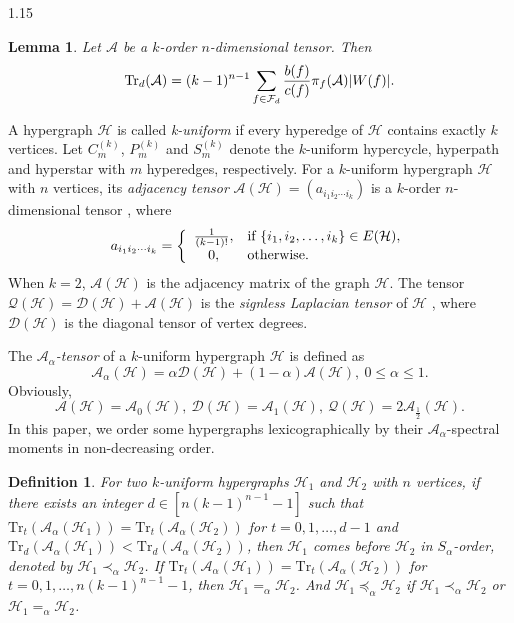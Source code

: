 \documentclass[preprint,12pt]{elsarticle1}
\newtheorem{lem}[thm]{Lemma}
\newtheorem{defi}[thm]{Definition}
\numberwithin{equation}{section}
\begin{document}
\begin{spacing}{1.15}
\begin{lem}\label{Shao}\cite{ref8}
		Let $\mathcal{A}$ be a $k$-order $n$-dimensional tensor. Then
		\begin{equation*}\label{shaodegongshi}
			\textnormal{Tr}_{d}(\mathcal{A})=(k-1)^{n-1} \sum_{f \in \mathcal{F}_{d}} \frac{b(f)}{c(f)} \pi_{f}(\mathcal{A})|W(f)|.
		\end{equation*}
	\end{lem}	

A hypergraph $\mathcal{H}$ is called \textit{k-uniform} if every hyperedge of $\mathcal{H}$ contains exactly $k$ vertices.
Let $C_{m}^{(k)}$, $P_{m}^{(k)}$ and $S_{m}^{(k)}$ denote the $k$-uniform hypercycle, hyperpath and hyperstar with $m$ hyperedges, respectively.
For a $k$-uniform hypergraph $\mathcal{H}$ with $n$ vertices, its \textit{adjacency tensor} $\mathcal{A}(\mathcal{H})=(a_{i_1 i_2 \cdots i_k})$ is a $k$-order $n$-dimensional tensor \cite{ref3}, where
		$$a_{i_1 i_2 \cdots i_k}=\left\{\begin{array}{cl}
			\frac{1}{(k-1)!},&  \textnormal{if}\ \{i_1,i_2,\ldots,i_k\}\in E(\mathcal{H}),\\
			0,& \textnormal{otherwise}.
		\end{array}\right.$$
When $k=2$, $\mathcal{A}(\mathcal{H})$ is the adjacency matrix of the graph $\mathcal{H}$.
The tensor $\mathcal{Q}(\mathcal{H})=\mathcal{D}(\mathcal{H})+\mathcal{A}(\mathcal{H})$ is the \textit{signless Laplacian tensor} of $\mathcal{H}$ \cite{ref5}, where $\mathcal{D}(\mathcal{H})$ is the diagonal tensor of vertex degrees.

The \textit{$\mathcal{A}_{\alpha}$-tensor} of a $k$-uniform hypergraph $\mathcal{H}$ is defined as \cite{alphaofhypergraph}
$$\mathcal{A}_{\alpha}(\mathcal{H})=\alpha\mathcal{D}(\mathcal{H})+(1-\alpha)\mathcal{A}(\mathcal{H}),~ 0\le\alpha\le1.$$
Obviously, $$\mathcal{A}(\mathcal{H})=\mathcal{A}_{0}(\mathcal{H}),~ \mathcal{D}(\mathcal{H})=\mathcal{A}_{1}(\mathcal{H}),~ \mathcal{Q}(\mathcal{H})=2\mathcal{A}_{\frac{1}{2}}(\mathcal{H}).$$
In this paper, we order some hypergraphs lexicographically by their $\mathcal{A}_{\alpha}$-spectral moments in non-decreasing order.

\begin{defi}
For two $k$-uniform hypergraphs $\mathcal{H}_1$ and $\mathcal{H}_2$ with $n$ vertices,
if there exists an integer $d\in[n(k-1)^{n-1}-1]$ such that $\mathrm{Tr}_t(\mathcal{A}_{\alpha}(\mathcal{H}_1))=\mathrm{Tr}_{t}(\mathcal{A}_{\alpha}(\mathcal{H}_2))$ for $t=0,1,\ldots,d-1$ and $\mathrm{Tr}_d(\mathcal{A}_{\alpha}(\mathcal{H}_1))<\mathrm{Tr}_{d}(\mathcal{A}_{\alpha}(\mathcal{H}_2))$, then $\mathcal{H}_{1}$ comes before $\mathcal{H}_{2}$ in $S_{\alpha}$-order, denoted by $\mathcal{H}_{1} \prec_{\alpha} \mathcal{H}_{2}$.
If $\mathrm{Tr}_t(\mathcal{A}_{\alpha}(\mathcal{H}_1))=\mathrm{Tr}_{t}(\mathcal{A}_{\alpha}(\mathcal{H}_2))$ for $t=0,1,\ldots,n(k-1)^{n-1}-1$, then $\mathcal{H}_1=_{\alpha}\mathcal{H}_2$.
And $\mathcal{H}_{1}\preceq_{\alpha}\mathcal{H}_{2}$ if $\mathcal{H}_{1}\prec_{\alpha}\mathcal{H}_{2}$ or $\mathcal{H}_{1}=_{\alpha}\mathcal{H}_{2}$.
\end{defi}


\end{spacing}
\end{document}
